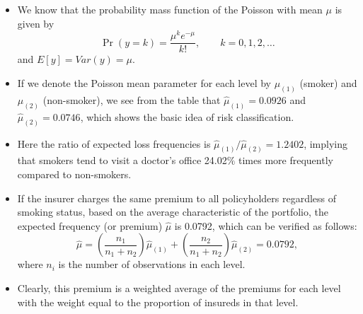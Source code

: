 \documentclass[ignorenonframetext,]{beamer}
\begin{document}
\begin{frame}[allowframebreaks]
\framebreak

\begin{itemize}
\item We know that the probability mass function of the Poisson with mean $\mu$ is given by
\begin{equation} \label{eq:Pois-pmf-1}
\Pr(y=k)=\frac{\mu^k e^{-\mu}}{k!},\qquad k=0,1,2, \ldots
\end{equation}
and $E{[y]}=Var{(y)}=\mu$. 
\item If we denote the Poisson mean parameter for each level by $\mu_{(1)}$ (smoker) and $\mu_{(2)}$ (non-smoker), we see from the table that $\hat{\mu}_{(1)}=0.0926$ and $\hat{\mu}_{(2)}=0.0746$, which shows the basic idea of risk classification. 
\item Here the ratio of expected loss frequencies is $\hat{\mu}_{(1)}/\hat{\mu}_{(2)}=1.2402$, implying that smokers tend to visit a doctor's office 24.02$\%$ times more frequently compared to non-smokers.
\end{itemize}

\framebreak

\begin{itemize}
\item If the insurer charges the same premium to all policyholders regardless of smoking status, based on the average characteristic of the portfolio, the expected frequency (or premium) $\hat{\mu}$ is 0.0792, which can be verified as follows:
$$
\hat{\mu} = \left(\frac{n_1}{n_1+n_2}\right)\hat{\mu}_{(1)}+\left(\frac{n_2}{n_1+n_2}\right)\hat{\mu}_{(2)}=0.0792,
$$
where $n_i$ is the number of observations in each level. 
\item Clearly, this premium is a weighted average of the premiums for each level with the weight equal to the proportion of insureds in that level.  
\end{itemize}

\end{frame}
\end{document}
